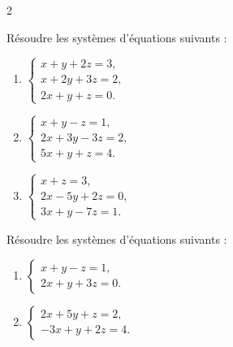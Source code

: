 \documentclass[a4paper,12pt]{article}
\title{
\centering
\tcbset{colframe=BlackSav,colback=GrayBG}
\tcbox[tikznode]{
  Chapitre 7 \\ Matrices et systèmes linéaires
}
}
\author{}
\date{}
\begin{document}
\maketitle

\begin{multicols}{2}

\begin{exercice}[title=Exercice 1 $\star$ { [Calculer] }]{}{}
  Résoudre les systèmes d’équations suivants :

  \begin{enumerate}
    \item $\displaystyle
      \begin{cases}
        x + y + 2z = 3,\\
        x + 2y + 3z = 2,\\
        2x + y + z = 0.
      \end{cases}$

    \item $\displaystyle
      \begin{cases}
        x + y - z = 1,\\
        2x + 3y - 3z = 2,\\
        5x + y + z = 4.
      \end{cases}$

    \item $\displaystyle
      \begin{cases}
        x + z = 3,\\
        2x - 5y + 2z = 0,\\
        3x + y - 7z = 1.
      \end{cases}$
  \end{enumerate}
\end{exercice}

\begin{exercice}[title=Exercice 2 $\star\star$ { [Calculer] }]{}{}
  Résoudre les systèmes d’équations suivants :

  \begin{enumerate}
    \item $\displaystyle
      \begin{cases}
        x + y - z = 1,\\
        2x + y + 3z = 0.
      \end{cases}$

    \item $\displaystyle
      \begin{cases}
        2x + 5y + z = 2,\\
        -3x + y + 2z = 4.
      \end{cases}$


\end{enumerate}
\end{exercice}
\end{multicols}
\end{document}
